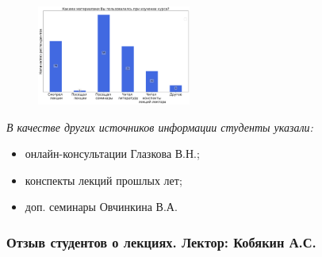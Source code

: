             \begin{figure}[H]
                \centering
                \includegraphics[width = 0.45\textwidth]{images/3 course/Общая физика - квантовая физика/materials.png}
            \end{figure}

            \textit{В качестве других источников информации студенты указали:} 
            \begin{itemize}
                \item онлайн-консультации Глазкова В.Н.;
                \item конспекты лекций прошлых лет;
                \item доп. семинары Овчинкина В.А.
            \end{itemize}

        \subsubsection{Отзыв студентов о лекциях. Лектор: Кобякин А.С.}

